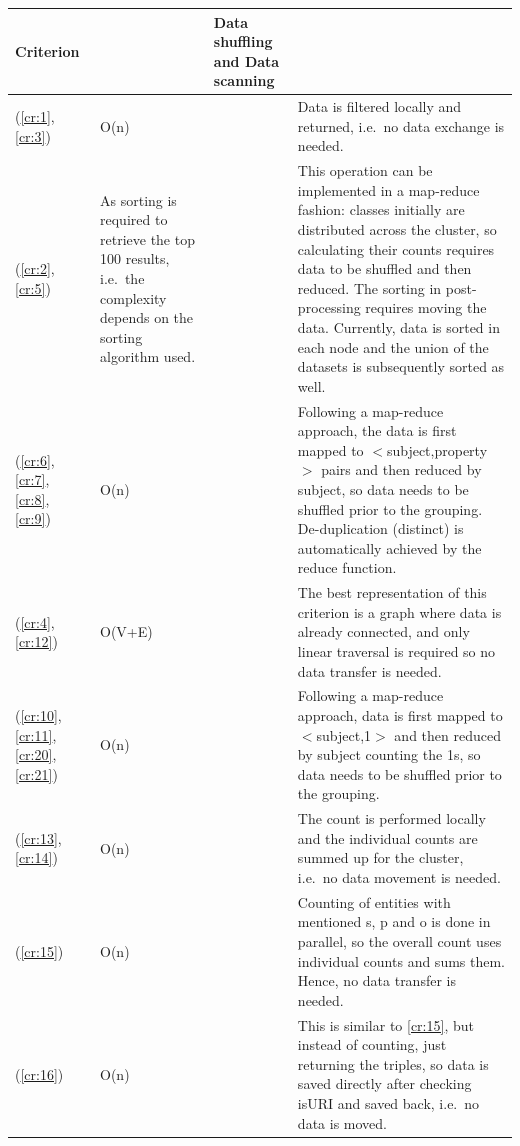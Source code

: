 \begin{table}[t]
\centering
\begin{tabularx}{\linewidth}{>{\scriptsize}p{1.5cm}|>{\scriptsize}p{3.9cm}>{\scriptsize}p{0.2cm}|>{\scriptsize}p{8.2cm}}
  \textbf{Criterion} & 
  \multicolumn{2}{l|}{\textbf{\scriptsize{Runtime Complexity}}} & 
 \textbf{Data shuffling and Data scanning} \\
\hline
   (\ref{cr:1}, \ref{cr:3}) & 
  O(n) & & 
 Data is filtered locally and returned, i.e.~no data exchange is needed.
\\
\hline
   (\ref{cr:2}, \ref{cr:5}) & 
As sorting is required to retrieve the top 100 results, i.e.~the complexity depends on the sorting algorithm used.
 & & 
This operation can be implemented in a map-reduce fashion: classes initially are distributed across the cluster, so calculating their counts requires data to be shuffled and then reduced. The sorting in post-processing requires moving the data. Currently, data is sorted in each node and the union of the datasets is subsequently sorted as well.
 \\
 \hline
   (\ref{cr:6}, \ref{cr:7}, \ref{cr:8}, \ref{cr:9}) & 
  O(n) & & 
  Following a map-reduce approach, the data is first mapped to $<$subject,property$>$ pairs and then reduced by subject, so data needs to be shuffled prior to the grouping. De-duplication (distinct) is automatically achieved by the reduce function.
 \\
\hline
   (\ref{cr:4}, \ref{cr:12})  & 
O(V+E) %
 & & 
The best representation of this criterion is a graph where data is already connected, and only linear traversal is required so no data transfer is needed.
 \\
\hline
   (\ref{cr:10}, \ref{cr:11}, \ref{cr:20}, \ref{cr:21}) & 
  O(n) & & 
 Following a map-reduce approach, data is first mapped to $<$subject,1$>$ and then reduced by subject counting the 1s, so data needs to be shuffled prior to the grouping.  \\
\hline
(\ref{cr:13}, \ref{cr:14}) & 
  O(n) & & 
The count is performed locally and the individual counts are summed up for the cluster, i.e.~no data movement is needed.
\\
\hline
 (\ref{cr:15}) & 
  O(n) & & 
  Counting of entities with mentioned s, p and o is done in parallel, so the overall count uses individual counts and sums them. Hence, no data transfer is needed.
 \\
\hline
  (\ref{cr:16}) & 
  O(n) & & 
  This is similar to \ref{cr:15}, but instead of counting, just returning the triples, so data is saved directly after checking isURI and saved back, i.e.~no data is moved.

\end{tabularx}
\end{table}
